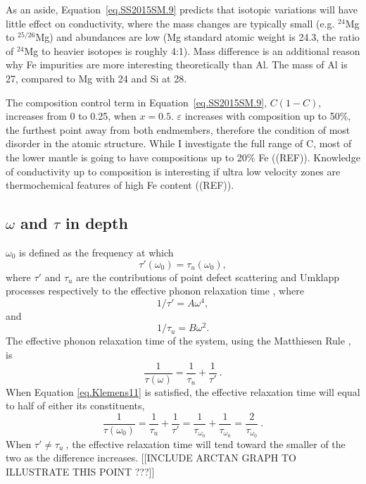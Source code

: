 As an aside, Equation~\ref{eq.SS2015SM.9} predicts that isotopic variations will have little effect on conductivity, where the mass changes are typically small (e.g. $^{24}$Mg to $^{25/26}$Mg) and abundances are low (Mg standard atomic weight is 24.3, the ratio of $^{24}$Mg to heavier isotopes is roughly 4:1). Mass difference is an additional reason why Fe impurities are more interesting theoretically than Al. The mass of Al is 27, compared to Mg with 24 and Si at 28.

The composition control term in Equation~\ref{eq.SS2015SM.9}, $C(1-C)$, increases from 0 to 0.25, when $x = 0.5$. $\varepsilon$ increases with composition up to 50\%, the furthest point away from both endmembers, therefore the condition of most disorder in the atomic structure. While I investigate the full range of C, most of the lower mantle \mgfesios is going to have compositions up to 20\% Fe ((REF)). Knowledge of conductivity up to \fesios composition is interesting if ultra low velocity zones are thermochemical features of high Fe content ((REF)). 





\subsection{$\omega$ and $\tau$ in depth} 

$\omega_{\mathrm{0}}$ is defined \citep[by][Eq. 11]{Klemens1960} as the frequency at which 
%
\begin{equation}
{\tau}'\left ( \omega_{\mathrm{0}} \right ) = \tau_{u}\left ( \omega_{\mathrm{0}} \right ),
\label{eq.Klemens11}
\end{equation}
%
where ${\tau}'$ and $\tau_{u}$ are the contributions of point defect scattering and Umklapp processes respectively to the effective phonon relaxation time \citep[][Eq.~2~\&~3]{Klemens1960}, where
%
\begin{equation}
1/{\tau}'= A\omega^{4},
\label{eq.Klemens2}
\end{equation}
%
and 
%
\begin{equation}
1/\tau_{u}=B\omega^{2}.
\label{eq.Klemens3}
\end{equation}
%
The effective phonon relaxation time of the system, using the Matthiesen Rule \citep[modified from][Eq. 7]{Klemens1960}, is  
%
\begin{equation}
\frac{1}{\tau \left ( \omega \right )} = \frac{1}{\tau_{u}} + \frac{1}{{\tau}'}\ .
\label{eq.Klemens7}
\end{equation}
%
When Equation \ref{eq.Klemens11} is satisfied, the effective relaxation time will equal to half of either its constituents,
%
\begin{equation}
\frac{1}{\tau \left ( \omega_{0} \right )} = \frac{1}{\tau_{u}} + \frac{1}{{\tau}'} = \frac{1}{\tau_{\omega_{0}}} + \frac{1}{\tau_{\omega_{0}}} = \frac{2}{\tau_{\omega_{0}}}\ .
\label{eq.Klemens7ex}
\end{equation}
%
When ${\tau}' \neq \tau_{u}\ $, the effective relaxation time will tend toward the smaller of the two as the difference increases. [[INCLUDE ARCTAN GRAPH TO ILLUSTRATE THIS POINT ???]]

